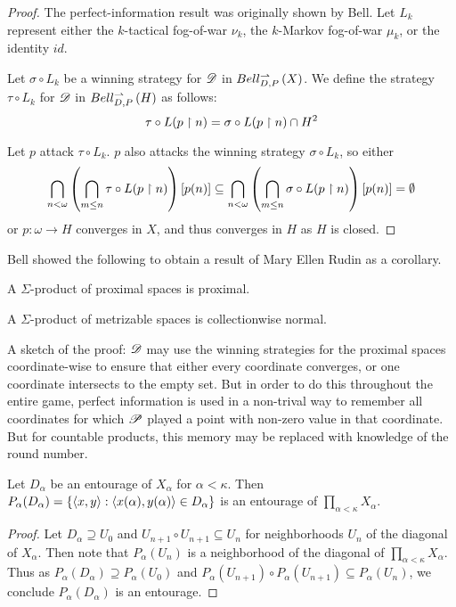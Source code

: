 \begin{proof}
  The perfect-information result was originally shown by Bell.
  Let $L_k$ represent either the $k$-tactical fog-of-war $\nu_k$,
  the $k$-Markov fog-of-war $\mu_k$, or the identity $id$.

  Let $\sigma\circ L_k$ be a winning strategy for $\mathscr{D}$ in $Bell_{D,P}^{\rightharpoonup}\left({X}\right)$.
  We define the strategy $\tau\circ L_k$ for $\mathscr{D}$ in $Bell_{D,P}^{\rightharpoonup}\left({H}\right)$ as
  follows:
    \[
      \tau\circ L(p\restriction n)
        =
      \sigma\circ L(p\restriction n)
        \cap
      H^2
    \]

  Let $p$ attack $\tau\circ L_k$. $p$ also attacks the winning strategy
  $\sigma\circ L_k$, so either
    \[
      \bigcap_{n<\omega}
      \left(\bigcap_{m\leq n}\tau\circ L(p\restriction n)\right)
      [p(n)]
        \subseteq
      \bigcap_{n<\omega}
      \left(\bigcap_{m\leq n}\sigma\circ L(p\restriction n)\right)
      [p(n)]
        =
      \emptyset
    \]
  or $p:\omega\to H$ converges in $X$, and thus converges in $H$ as $H$ is
  closed.
\end{proof}

Bell showed the following to obtain a result of Mary Ellen Rudin \cite{MR716576}
as a corollary.

\begin{thm}
  A $\Sigma$-product of proximal spaces is proximal.
\end{thm}

\begin{cor}
  A $\Sigma$-product of metrizable spaces is collectionwise normal.
\end{cor}

A sketch of the proof: $\mathscr{D}$ may use the winning strategies for the
proximal spaces coordinate-wise to ensure that either every coordinate
converges, or one coordinate intersects to the empty set. But in order to do
this throughout the entire game, perfect information is used in a non-trival
way to remember all coordinates for which $\mathscr{P}$ played a point with
non-zero value in that coordinate. But for countable products, this memory
may be replaced with knowledge of the round number.

\begin{lem}
  Let $D_\alpha$ be an entourage of $X_\alpha$ for $\alpha<\kappa$. Then
  $P_\alpha(D_\alpha)=\{\langle x,y\rangle:\langle x(\alpha),y(\alpha)\rangle\in D_\alpha\}$
  is an entourage of $\prod_{\alpha<\kappa} X_\alpha$.
\end{lem}

\begin{proof}
  Let $D_\alpha\supseteq U_0$ and $U_{n+1}\circ U_{n+1}\subseteq U_n$ for
  neighborhoods $U_n$ of the diagonal of $X_\alpha$. Then note that
  $P_\alpha(U_{n})$ is a neighborhood of the diagonal of
  $\prod_{\alpha<\kappa} X_\alpha$. Thus as
  $P_\alpha(D_\alpha) \supseteq P_\alpha(U_0)$ and
  $P_\alpha(U_{n+1})\circ P_\alpha(U_{n+1})\subseteq P_\alpha(U_{n})$,
  we conclude $P_\alpha(D_\alpha)$ is an entourage.
\end{proof}

